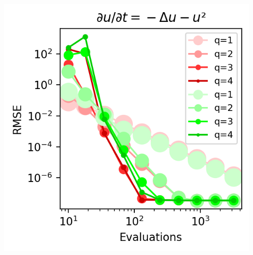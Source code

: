 \begin{center}
    \label{fig:heat medium}
    \includegraphics[width=\columnwidth]{../images/solver_heat and big square.png}
    \label{fig:heat big}
\end{center}
